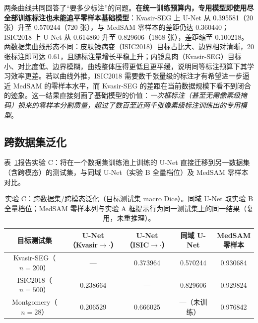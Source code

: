 \documentclass[zihao=-4,a4paper]{ctexart}
\begin{document}
两条曲线共同回答了``要多少标注''的问题。\textbf{在统一训练预算内，专用模型即使用尽全部训练标注也未能追平零样本基础模型}：Kvasir-SEG 上 U-Net 从 0.395581（20 张）升至 0.570244（720 张），与 MedSAM 零样本的差距仍达 0.360440；ISIC2018 上 U-Net 从 0.614860 升至 0.829606（1868 张），差距缩至 0.100218。两数据集曲线形态不同：皮肤镜病变（ISIC2018）目标占比大、边界相对清晰，20 张标注即可达 0.61，且随标注量增长平稳上升；内镜息肉（Kvasir-SEG）目标小、对比度低、边界模糊，曲线整体压得更低且更平缓，说明同等标注预算下其学习效率更差。若以曲线外推，ISIC2018 需要数千张量级的标注才有希望进一步逼近 MedSAM 的零样本水平，而 Kvasir-SEG 的差距在当前数据规模下看不到闭合的迹象。这一结果直接刻画了基础模型的价值：\emph{一次框标注（甚至无需像素级掩码）换来的零样本分割质量，超过了数百至近两千张像素级标注训练出的专用模型}。

\subsection{跨数据集泛化}

表~\ref{tab:cross}报告实验 C：将在一个数据集训练池上训练的 U-Net 直接迁移到另一数据集（含跨模态）的测试集，与同域 U-Net（实验 B 全量档位）及 MedSAM 零样本对比。

\begin{table}[htbp]
\centering
\caption{实验 C：跨数据集/跨模态泛化（目标测试集 macro Dice）。同域 U-Net 取实验 B 全量档位；MedSAM 零样本列与实验 A 框提示行为同一测试集上的同一结果（复用，未重推理）。}
\label{tab:cross}
\footnotesize
\setlength{\tabcolsep}{3.5pt}
\begin{tabular}{ccccc}
\toprule
目标测试集 & \makecell{U-Net\\（Kvasir$\rightarrow\cdot$）} & \makecell{U-Net\\（ISIC$\rightarrow\cdot$）} & 同域 U-Net & \makecell{MedSAM\\零样本} \\
\midrule
Kvasir-SEG（$n=200$） & --- & 0.373964 & 0.570244 & 0.930684 \\
ISIC2018（$n=500$）   & 0.238664 & --- & 0.829606 & 0.929824 \\
Montgomery（$n=28$）  & 0.206529 & 0.666025 & ---（未训练） & 0.976842 \\
\bottomrule
\end{tabular}
\end{table}
\end{document}
